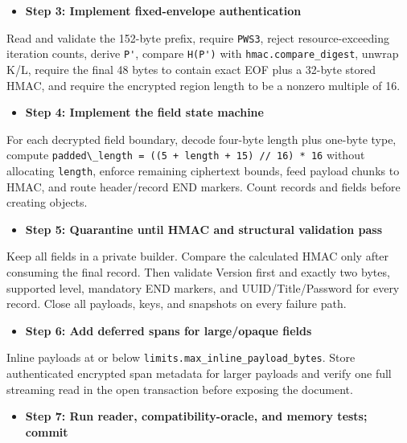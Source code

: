 \documentclass[
  letterpaper,
]{article}
\newcommand{\passthrough}[1]{#1}
\providecommand{\tightlist}{%
  \setlength{\itemsep}{0pt}\setlength{\parskip}{0pt}}
\begin{document}
\begin{itemize}
\tightlist
\item[$\square$]
  \textbf{Step 3: Implement fixed-envelope authentication}
\end{itemize}

Read and validate the 152-byte prefix, require \passthrough{\lstinline!PWS3!}, reject resource-exceeding iteration
counts, derive \passthrough{\lstinline!P'!}, compare \passthrough{\lstinline!H(P')!} with
\nolinkurl{hmac.compare_digest}, unwrap K/L, require the final 48 bytes to contain exact EOF plus a 32-byte stored HMAC,
and require the encrypted region length to be a nonzero multiple of 16.

\begin{itemize}
\tightlist
\item[$\square$]
  \textbf{Step 4: Implement the field state machine}
\end{itemize}

For each decrypted field boundary, decode four-byte length plus one-byte type, compute
\passthrough{\lstinline!padded\_length = ((5 + length + 15) // 16) * 16!} without allocating
\passthrough{\lstinline!length!}, enforce remaining ciphertext bounds, feed payload chunks to HMAC, and route
header/record END markers. Count records and fields before creating objects.

\begin{itemize}
\tightlist
\item[$\square$]
  \textbf{Step 5: Quarantine until HMAC and structural validation pass}
\end{itemize}

Keep all fields in a private builder. Compare the calculated HMAC only after consuming the final record. Then validate
Version first and exactly two bytes, supported level, mandatory END markers, and UUID/Title/Password for every record.
Close all payloads, keys, and snapshots on every failure path.

\begin{itemize}
\tightlist
\item[$\square$]
  \textbf{Step 6: Add deferred spans for large/opaque fields}
\end{itemize}

Inline payloads at or below \nolinkurl{limits.max_inline_payload_bytes}. Store authenticated encrypted span metadata for
larger payloads and verify one full streaming read in the open transaction before exposing the document.

\begin{itemize}
\tightlist
\item[$\square$]
  \textbf{Step 7: Run reader, compatibility-oracle, and memory tests; commit}
\end{itemize}
\end{document}

